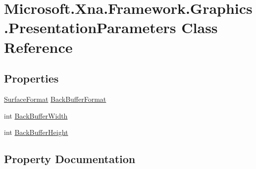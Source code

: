 \hypertarget{class_microsoft_1_1_xna_1_1_framework_1_1_graphics_1_1_presentation_parameters}{}\section{Microsoft.\+Xna.\+Framework.\+Graphics.\+Presentation\+Parameters Class Reference}
\label{class_microsoft_1_1_xna_1_1_framework_1_1_graphics_1_1_presentation_parameters}
\subsection*{Properties}
\begin{DoxyCompactItemize}
\item 
\hyperlink{namespace_microsoft_1_1_xna_1_1_framework_1_1_graphics_abb47f8b6c5b33dc8516f74c0e80dbfba}{Surface\+Format} \hyperlink{class_microsoft_1_1_xna_1_1_framework_1_1_graphics_1_1_presentation_parameters_a903f3dd668360132979a05dd32cd92a7}{Back\+Buffer\+Format}
\item 
int \hyperlink{class_microsoft_1_1_xna_1_1_framework_1_1_graphics_1_1_presentation_parameters_ae1c122e4ab5bb54401c5391be158b01b}{Back\+Buffer\+Width}
\item 
int \hyperlink{class_microsoft_1_1_xna_1_1_framework_1_1_graphics_1_1_presentation_parameters_ad687e79e9da6258abf9b2ebcf380ccbc}{Back\+Buffer\+Height}
\end{DoxyCompactItemize}


\subsection{Property Documentation}
\hypertarget{class_microsoft_1_1_xna_1_1_framework_1_1_graphics_1_1_presentation_parameters_a903f3dd668360132979a05dd32cd92a7}{}
